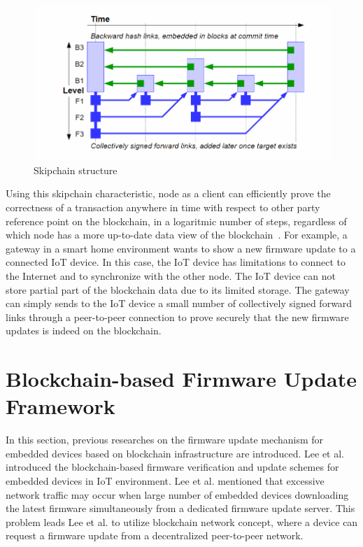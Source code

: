 \begin{figure}[H]
	\begin{center}
		\includegraphics[width=1.0\textwidth]{figures/skipchainStructure.png}
		\caption{Skipchain structure~\cite{chainiac}} 
		\label{fig:6_skipchainStructure}
	\end{center}
\end{figure}

Using this skipchain characteristic, node as a client can efficiently prove the correctness of a transaction anywhere in time with respect to other party reference point on the blockchain, in a logaritmic number of steps, regardless of which node has a more up-to-date data view of the blockchain~\cite{Skipchain}. For example, a gateway in a smart home environment wants to show a new firmware update to a connected IoT device. In this case, the IoT device has limitations to connect to the Internet and to synchronize with the other node. The IoT device can not store partial part of the blockchain data due to its limited storage. The gateway can simply sends to the IoT device a small number of collectively signed forward links through a peer-to-peer connection to prove securely that the new firmware updates is indeed on the blockchain. 

\section{Blockchain-based Firmware Update Framework}
\label{sec:5_proposedFramework}

In this section, previous researches on the firmware update mechanism for embedded devices based on blockchain infrastructure are introduced. Lee et al.~\cite{lee} introduced the blockchain-based firmware verification and update schemes for embedded devices in IoT environment. Lee et al. mentioned that excessive network traffic may occur when large number of embedded devices downloading the latest firmware simultaneously from a dedicated firmware update server. This problem leads Lee et al. to utilize blockchain network concept, where a device can request a firmware update from a decentralized peer-to-peer network.

